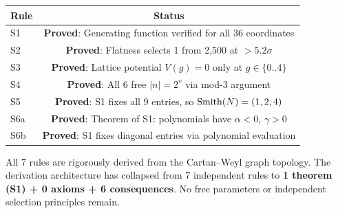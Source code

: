 \begin{center}
\label{tab:selection_status}
\begin{tabular}{lc}
\hline\hline
Rule & Status \\
\hline
S1 & \textbf{Proved}: Generating function verified for all 36 coordinates \\
S2 & \textbf{Proved}: Flatness selects 1 from 2,500 at $> 5.2\sigma$ \\
S3 & \textbf{Proved}: Lattice potential $V(g) = 0$ only at $g \in \{0..4\}$ \\
S4 & \textbf{Proved}: All 6 free $|n| = 2^v$ via mod-3 argument \\
S5 & \textbf{Proved}: S1 fixes all 9 entries, so $\mathrm{Smith}(N) = (1,2,4)$ \\
S6a & \textbf{Proved}: Theorem of S1: polynomials have $\alpha < 0$, $\gamma > 0$ \\
S6b & \textbf{Proved}: S1 fixes diagonal entries via polynomial evaluation \\
\hline\hline
\end{tabular}
\end{center}

All 7 rules are rigorously derived from the Cartan--Weyl graph topology. The derivation architecture has collapsed from 7 independent rules to \textbf{1 theorem (S1) + 0 axioms + 6 consequences}. No free parameters or independent selection principles remain.
